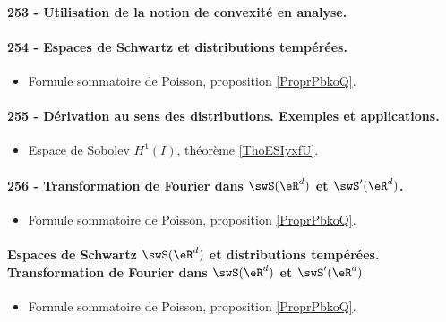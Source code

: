 \paragraph{253 - Utilisation de la notion de convexité en analyse.}
\paragraph{254 - Espaces de Schwartz et distributions tempérées.}
\begin{itemize}
    \item Formule sommatoire de Poisson, proposition \ref{ProprPbkoQ}.
\end{itemize}
\paragraph{255 - Dérivation au sens des distributions. Exemples et applications.}
\begin{itemize}
    \item Espace de Sobolev \( H^1(I)\), théorème \ref{ThoESIyxfU}.
\end{itemize}
\paragraph{256 - Transformation de Fourier dans \( \swS(\eR^d)\) et \( \swS'(\eR^d)\).}
\begin{itemize}
    \item Formule sommatoire de Poisson, proposition \ref{ProprPbkoQ}.
\end{itemize}
\paragraph{Espaces de Schwartz \( \swS(\eR^d)\) et distributions tempérées. Transformation de Fourier dans \( \swS(\eR^d)\) et \( \swS'(\eR^d)\)}
\begin{itemize}
    \item Formule sommatoire de Poisson, proposition \ref{ProprPbkoQ}.
\end{itemize}
